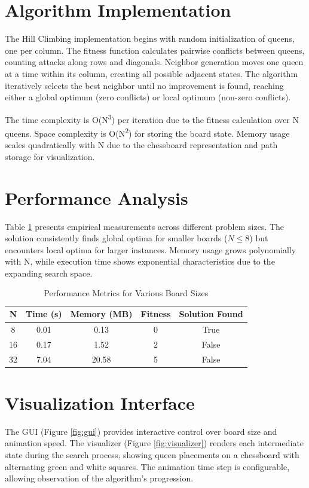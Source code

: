\documentclass{report}
\begin{document}
	\section{Algorithm Implementation}
	The Hill Climbing implementation begins with random initialization of queens, one per column. The fitness function calculates pairwise conflicts between queens, counting attacks along rows and diagonals. Neighbor generation moves one queen at a time within its column, creating all possible adjacent states. The algorithm iteratively selects the best neighbor until no improvement is found, reaching either a global optimum (zero conflicts) or local optimum (non-zero conflicts).
	
	The time complexity is O(N\textsuperscript{3}) per iteration due to the fitness calculation over N queens. Space complexity is O(N\textsuperscript{2}) for storing the board state. Memory usage scales quadratically with N due to the chessboard representation and path storage for visualization.
	
	\section{Performance Analysis}
	Table \ref{tab:performance} presents empirical measurements across different problem sizes. The solution consistently finds global optima for smaller boards ($N \le 8$) but encounters local optima for larger instances. Memory usage grows polynomially with N, while execution time shows exponential characteristics due to the expanding search space.
	
	\begin{table}[h]
		\centering
		\caption{Performance Metrics for Various Board Sizes}
		\label{tab:performance}
		\begin{tabular}{ccccc}
			\toprule
			\textbf{N} & \textbf{Time (s)} & \textbf{Memory (MB)} & \textbf{Fitness} & \textbf{Solution Found} \\
			\midrule
			8 & 0.01 & 0.13 & 0 & True \\
			16 & 0.17 & 1.52 & 2 & False \\
			32 & 7.04 & 20.58 & 5 & False \\
			\bottomrule
		\end{tabular}
	\end{table}
	
	\section{Visualization Interface}
	The GUI (Figure \ref{fig:gui}) provides interactive control over board size and animation speed. The visualizer (Figure \ref{fig:visualizer}) renders each intermediate state during the search process, showing queen placements on a chessboard with alternating green and white squares. The animation time step is configurable, allowing observation of the algorithm's progression.
	
\end{document}
